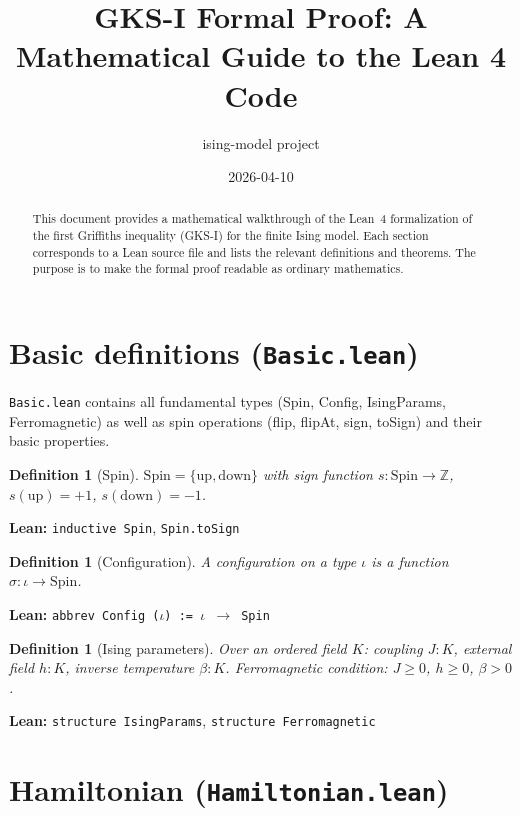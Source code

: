 \documentclass[a4paper,11pt]{article}
\title{GKS-I Formal Proof: A Mathematical Guide to the Lean 4 Code}
\author{ising-model project}
\date{2026-04-10}
\newtheorem{definition}[theorem]{Definition}
\begin{document}
\maketitle

\begin{abstract}
This document provides a mathematical walkthrough of the Lean~4
formalization of the first Griffiths inequality (GKS-I) for
the finite Ising model. Each section corresponds to a Lean source file
and lists the relevant definitions and theorems. The purpose is to
make the formal proof readable as ordinary mathematics.
\end{abstract}

\tableofcontents

\section{Basic definitions (\texttt{Basic.lean})}

\texttt{Basic.lean} contains all fundamental types (Spin, Config,
IsingParams, Ferromagnetic) as well as spin operations (flip,
flipAt, sign, toSign) and their basic properties.

\begin{definition}[Spin]
$\mathrm{Spin} = \{\mathrm{up}, \mathrm{down}\}$ with sign function
$s : \mathrm{Spin} \to \mathbb{Z}$, $s(\mathrm{up})=+1$,
$s(\mathrm{down})=-1$.
\end{definition}

\noindent\textbf{Lean:} \texttt{inductive Spin}, \texttt{Spin.toSign}

\begin{definition}[Configuration]
A configuration on a type $\iota$ is a function
$\sigma : \iota \to \mathrm{Spin}$.
\end{definition}

\noindent\textbf{Lean:} \texttt{abbrev Config ($\iota$) := $\iota$ $\to$ Spin}

\begin{definition}[Ising parameters]
Over an ordered field $K$: coupling $J : K$, external field $h : K$,
inverse temperature $\beta : K$.
Ferromagnetic condition: $J \geq 0$, $h \geq 0$, $\beta > 0$.
\end{definition}

\noindent\textbf{Lean:} \texttt{structure IsingParams},
\texttt{structure Ferromagnetic}

\section{Hamiltonian (\texttt{Hamiltonian.lean})}
\end{document}

